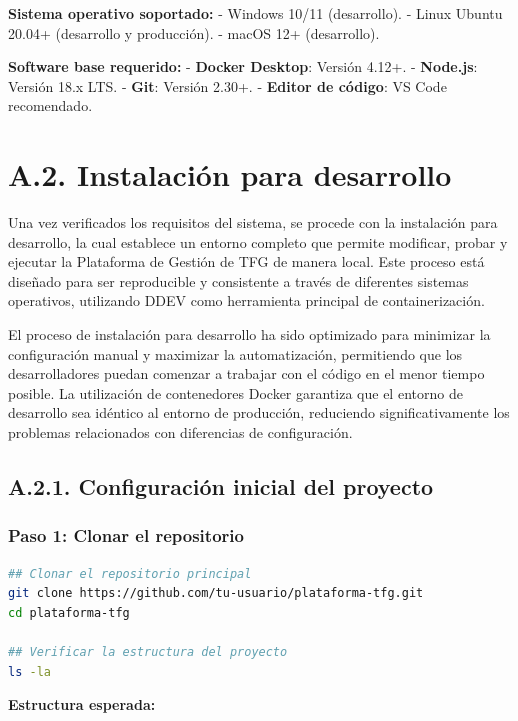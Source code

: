 \documentclass[12pt,a4paper,oneside]{report}
\begin{document}
{\textbf{Sistema operativo soportado:} - Windows 10/11 (desarrollo). -
Linux Ubuntu 20.04+ (desarrollo y producción). - macOS 12+ (desarrollo).

\textbf{Software base requerido:} - \textbf{Docker Desktop}: Versión
4.12+. - \textbf{Node.js}: Versión 18.x LTS. - \textbf{Git}: Versión
2.30+. - \textbf{Editor de código}: VS Code recomendado.

\section{A.2. Instalación para
desarrollo}\label{a.2.-instalaciuxf3n-para-desarrollo}

Una vez verificados los requisitos del sistema, se procede con la
instalación para desarrollo, la cual establece un entorno completo que
permite modificar, probar y ejecutar la Plataforma de Gestión de TFG de
manera local. Este proceso está diseñado para ser reproducible y
consistente a través de diferentes sistemas operativos, utilizando DDEV
como herramienta principal de containerización.

El proceso de instalación para desarrollo ha sido optimizado para
minimizar la configuración manual y maximizar la automatización,
permitiendo que los desarrolladores puedan comenzar a trabajar con el
código en el menor tiempo posible. La utilización de contenedores Docker
garantiza que el entorno de desarrollo sea idéntico al entorno de
producción, reduciendo significativamente los problemas relacionados con
diferencias de configuración.

\subsection{A.2.1. Configuración inicial del
proyecto}\label{a.2.1.-configuraciuxf3n-inicial-del-proyecto}

\subsubsection{Paso 1: Clonar el
repositorio}\label{paso-1-clonar-el-repositorio}

\begin{lstlisting}[language=bash]
## Clonar el repositorio principal
git clone https://github.com/tu-usuario/plataforma-tfg.git
cd plataforma-tfg

## Verificar la estructura del proyecto
ls -la
\end{lstlisting}

\textbf{Estructura esperada:}

}
\end{document}
